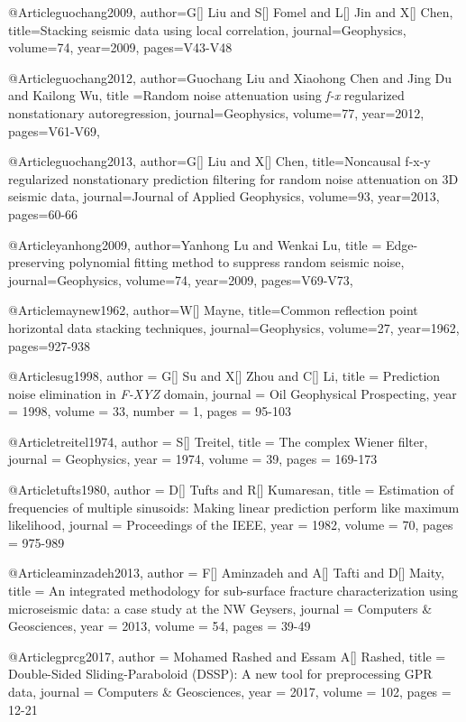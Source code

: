 @Article{guochang2009,
author={G[] Liu and S[] Fomel and L[] Jin and X[] Chen},
title={Stacking seismic data using local correlation},
journal={Geophysics},
volume=74,
year=2009,
pages={V43-V48}
}

@Article{guochang2012,
  author={Guochang Liu and Xiaohong Chen and Jing Du and Kailong Wu},
  title ={Random noise attenuation using \emph{f-x} regularized nonstationary autoregression},
  journal={Geophysics},
  volume=77,
  year=2012,
  pages={V61-V69},
}

@Article{guochang2013,
author={G[] Liu and X[] Chen},
title={Noncausal f-x-y regularized nonstationary prediction filtering for random noise attenuation on 3{D} seismic data},
journal={Journal of Applied Geophysics},
volume=93,
year=2013,
pages={60-66}
}

@Article{yanhong2009,
  author={Yanhong Lu and Wenkai Lu},
  title ={ Edge-preserving polynomial fitting method to suppress random seismic noise},
  journal={Geophysics},
  volume=74,
  year=2009,
  pages={V69-V73},
}

@Article{maynew1962,
author={W[] Mayne},
title={Common reflection point horizontal data stacking techniques},
journal={Geophysics},
volume=27,
year=1962,
pages={927-938}
}

@Article{sug1998,
  author = 	 {G[] Su and X[] Zhou and C[] Li},
  title = 	 { Prediction noise elimination in \emph{F-XYZ} domain},
  journal = 	 { Oil Geophysical Prospecting},
  year = 	 1998,
  volume = 	 33,
  number = 	 1,
  pages = 	 {95-103}}

@Article{treitel1974,
  author = 	 {S[] Treitel},
  title = 	 {The complex Wiener filter},
  journal = 	 { Geophysics},
  year = 	 1974,
  volume = 	 39,
  pages = 	 {169-173}}

@Article{tufts1980,
  author = 	 {D[] Tufts and R[] Kumaresan},
  title = 	 {Estimation of frequencies of multiple sinusoids: Making linear prediction perform like maximum likelihood},
  journal = 	 { Proceedings of the IEEE},
  year = 	 1982,
  volume = 	 70,
  pages = 	 {975-989}}

@Article{aminzadeh2013,
  author = 	 {F[] Aminzadeh and A[] Tafti and D[] Maity},
  title = 	 {An integrated methodology for sub-surface fracture characterization using microseismic data: a case study at the NW {G}eysers},
  journal = 	 { Computers \& Geosciences},
  year = 	 2013,
  volume = 	 54,
  pages = 	 {39-49}}

@Article{gprcg2017,
  author = 	 {Mohamed Rashed and Essam A[] Rashed},
  title = 	 {Double-Sided Sliding-Paraboloid (DSSP): A new tool for preprocessing GPR data},
  journal = 	 { Computers \& Geosciences},
  year = 	 2017,
  volume = 	 102,
  pages = 	 {12-21}}
  
